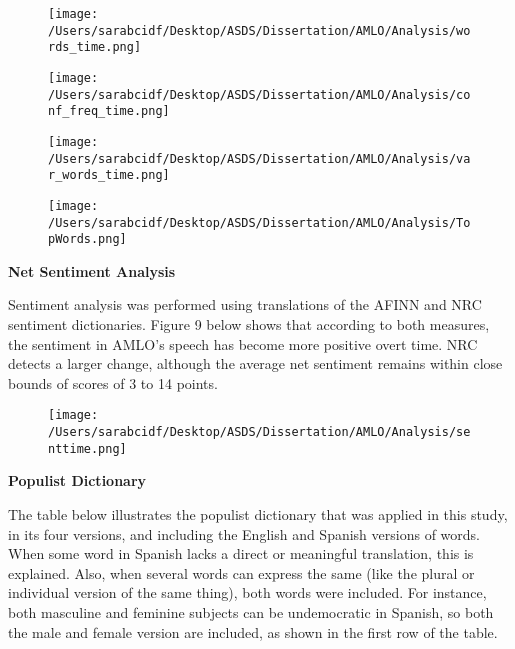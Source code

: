 \documentclass[]{article}
\begin{document}
\newpage
\vspace*{\fill}

\begin{figure}[H]
	\centering
	\caption{\label{}}
	\texttt{[image: /Users/sarabcidf/Desktop/ASDS/Dissertation/AMLO/Analysis/words\_time.png]}
\end{figure}

\begin{figure}[H]
	\centering
	\caption{\label{}}
	\texttt{[image: /Users/sarabcidf/Desktop/ASDS/Dissertation/AMLO/Analysis/conf\_freq\_time.png]}
\end{figure}

\vspace*{\fill}

\newpage
\vspace*{\fill}

\begin{figure}[H]
	\centering
	\caption{\label{}}
	\texttt{[image: /Users/sarabcidf/Desktop/ASDS/Dissertation/AMLO/Analysis/var\_words\_time.png]}
\end{figure}

\begin{figure}[H]
	\centering
	\caption{\label{}}
	\texttt{[image: /Users/sarabcidf/Desktop/ASDS/Dissertation/AMLO/Analysis/TopWords.png]}
\end{figure}

\vspace*{\fill}

\newpage
\vspace{.5cm}
\noindent\textbf{Net Sentiment Analysis}
\vspace{.5cm}

Sentiment analysis was performed using translations of the AFINN and NRC sentiment dictionaries. Figure 9 below shows that according to both measures, the sentiment in AMLO's speech has become more positive overt time. NRC detects a larger change, although the average net sentiment remains within close bounds of scores of 3 to 14 points. 

\begin{figure}[H]
	\centering
	\caption{\label{}}
	\texttt{[image: /Users/sarabcidf/Desktop/ASDS/Dissertation/AMLO/Analysis/senttime.png]}
\end{figure}

\noindent\textbf{Populist Dictionary}
\vspace{.5cm}

The table below illustrates the populist dictionary that was applied in this study, in its four versions, and including the English and Spanish versions of words. When some word in Spanish lacks a direct or meaningful translation, this is explained. Also, when several words can express the same (like the plural or individual version of the same thing), both words were included. For instance, both masculine and feminine subjects can be undemocratic in Spanish, so both the male and female version are included, as shown in the first row of the table. 
\end{document}
